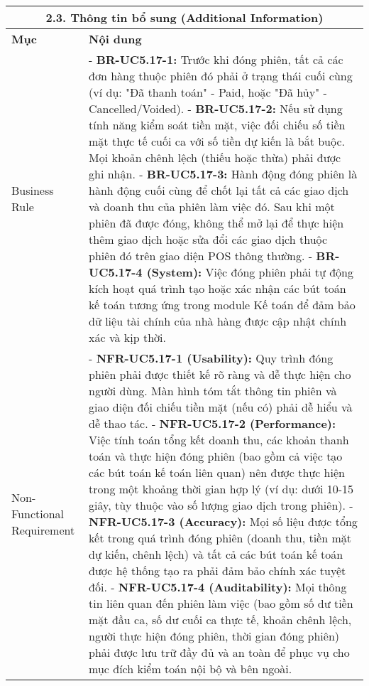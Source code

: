 \begin{longtable}{|m{4cm}|p{11cm}|}
\hline
\multicolumn{2}{|c|}{\textbf{2.3. Thông tin bổ sung (Additional Information)}} \\
\hline
\textbf{Mục} & \textbf{Nội dung} \\
\hline
Business Rule & - \textbf{BR-UC5.17-1:} Trước khi đóng phiên, tất cả các đơn hàng thuộc phiên đó phải ở trạng thái cuối cùng (ví dụ: "Đã thanh toán" - Paid, hoặc "Đã hủy" - Cancelled/Voided). \newline - \textbf{BR-UC5.17-2:} Nếu sử dụng tính năng kiểm soát tiền mặt, việc đối chiếu số tiền mặt thực tế cuối ca với số tiền dự kiến là bắt buộc. Mọi khoản chênh lệch (thiếu hoặc thừa) phải được ghi nhận. \newline - \textbf{BR-UC5.17-3:} Hành động đóng phiên là hành động cuối cùng để chốt lại tất cả các giao dịch và doanh thu của phiên làm việc đó. Sau khi một phiên đã được đóng, không thể mở lại để thực hiện thêm giao dịch hoặc sửa đổi các giao dịch thuộc phiên đó trên giao diện POS thông thường. \newline - \textbf{BR-UC5.17-4 (System):} Việc đóng phiên phải tự động kích hoạt quá trình tạo hoặc xác nhận các bút toán kế toán tương ứng trong module Kế toán để đảm bảo dữ liệu tài chính của nhà hàng được cập nhật chính xác và kịp thời. \\
\hline
Non-Functional Requirement & - \textbf{NFR-UC5.17-1 (Usability):} Quy trình đóng phiên phải được thiết kế rõ ràng và dễ thực hiện cho người dùng. Màn hình tóm tắt thông tin phiên và giao diện đối chiếu tiền mặt (nếu có) phải dễ hiểu và dễ thao tác. \newline - \textbf{NFR-UC5.17-2 (Performance):} Việc tính toán tổng kết doanh thu, các khoản thanh toán và thực hiện đóng phiên (bao gồm cả việc tạo các bút toán kế toán liên quan) nên được thực hiện trong một khoảng thời gian hợp lý (ví dụ: dưới 10-15 giây, tùy thuộc vào số lượng giao dịch trong phiên). \newline - \textbf{NFR-UC5.17-3 (Accuracy):} Mọi số liệu được tổng kết trong quá trình đóng phiên (doanh thu, tiền mặt dự kiến, chênh lệch) và tất cả các bút toán kế toán được hệ thống tạo ra phải đảm bảo chính xác tuyệt đối. \newline - \textbf{NFR-UC5.17-4 (Auditability):} Mọi thông tin liên quan đến phiên làm việc (bao gồm số dư tiền mặt đầu ca, số dư cuối ca thực tế, khoản chênh lệch, người thực hiện đóng phiên, thời gian đóng phiên) phải được lưu trữ đầy đủ và an toàn để phục vụ cho mục đích kiểm toán nội bộ và bên ngoài. \\
\hline
\end{longtable}

